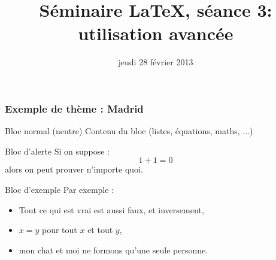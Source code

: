 \documentclass{beamer}
\title{Séminaire \LaTeX, séance 3: utilisation avancée}
\date{jeudi 28 février 2013}
\begin{document}

\begin{frame}[fragile]
  \frametitle{Exemple de thème : Madrid}

\begin{block}{Bloc normal (neutre)}
  Contenu du bloc (listes, équations, maths, ...)
\end{block}

\begin{alertblock}{Bloc d'alerte}
  Si on suppose :
  \begin{equation}
    1+1=0
  \end{equation}
  alors on peut prouver n'importe quoi.
\end{alertblock}

\begin{exampleblock}{Bloc d'exemple}
  Par exemple :
  \begin{itemize}
    \item Tout ce qui est vrai est aussi faux, et inversement,
    \item $x = y$ pour tout $x$ et tout $y$,
    \item mon chat et moi ne formons qu'une seule personne.
  \end{itemize}

\end{exampleblock}
\end{frame}


\end{document}
